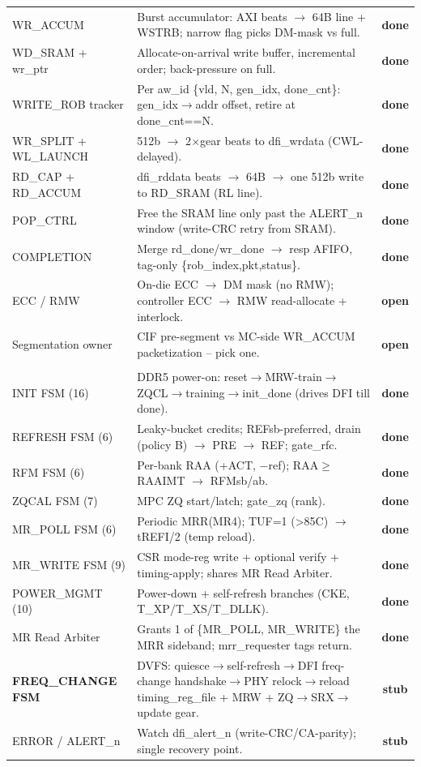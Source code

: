 \documentclass[10pt]{article}
\newcommand{\st}[1]{\textbf{\textcolor{done}{#1}}}
\newcommand{\op}[1]{\textbf{\textcolor{open}{#1}}}
\newcommand{\su}[1]{\textbf{\textcolor{stub}{#1}}}
\begin{document}
{\begin{longtable}{B P S}
\\
\midrule
WR\_ACCUM          & Burst accumulator: AXI beats $\to$ 64B line + WSTRB; narrow flag picks DM-mask vs full. & \st{done}\\
WD\_SRAM + wr\_ptr  & Allocate-on-arrival write buffer, incremental order; back-pressure on full. & \st{done}\\
WRITE\_ROB tracker & Per aw\_id \{vld, N, gen\_idx, done\_cnt\}: gen\_idx$\to$addr offset, retire at done\_cnt==N. & \st{done}\\
WR\_SPLIT + WL\_LAUNCH & 512b $\to$ 2$\times$gear beats to dfi\_wrdata (CWL-delayed). & \st{done}\\
RD\_CAP + RD\_ACCUM & dfi\_rddata beats $\to$ 64B $\to$ one 512b write to RD\_SRAM (RL line). & \st{done}\\
POP\_CTRL          & Free the SRAM line only past the ALERT\_n window (write-CRC retry from SRAM). & \st{done}\\
COMPLETION         & Merge rd\_done/wr\_done $\to$ resp AFIFO, tag-only \{rob\_index,pkt,status\}. & \st{done}\\
ECC / RMW          & On-die ECC $\to$ DM mask (no RMW); controller ECC $\to$ RMW read-allocate + interlock. & \op{open}\\
Segmentation owner & CIF pre-segment vs MC-side WR\_ACCUM packetization -- pick one. & \op{open}\\
\midrule

\\
\midrule
INIT FSM (16)      & DDR5 power-on: reset$\to$MRW-train$\to$ZQCL$\to$training$\to$init\_done (drives DFI till done). & \st{done}\\
REFRESH FSM (6)    & Leaky-bucket credits; REFsb-preferred, drain (policy B) $\to$ PRE $\to$ REF; gate\_rfc. & \st{done}\\
RFM FSM (6)        & Per-bank RAA (+ACT, $-$ref); RAA$\geq$RAAIMT $\to$ RFMsb/ab. & \st{done}\\
ZQCAL FSM (7)      & MPC ZQ start/latch; gate\_zq (rank). & \st{done}\\
MR\_POLL FSM (6)   & Periodic MRR(MR4); TUF=1 (>85C) $\to$ tREFI/2 (temp reload). & \st{done}\\
MR\_WRITE FSM (9)  & CSR mode-reg write + optional verify + timing-apply; shares MR Read Arbiter. & \st{done}\\
POWER\_MGMT (10)   & Power-down + self-refresh branches (CKE, T\_XP/T\_XS/T\_DLLK). & \st{done}\\
MR Read Arbiter    & Grants 1 of \{MR\_POLL, MR\_WRITE\} the MRR sideband; mrr\_requester tags return. & \st{done}\\
\textbf{FREQ\_CHANGE FSM} & DVFS: quiesce$\to$self-refresh$\to$DFI freq-change handshake$\to$PHY relock$\to$reload timing\_reg\_file + MRW + ZQ$\to$SRX$\to$update gear. & \su{stub}\\
ERROR / ALERT\_n   & Watch dfi\_alert\_n (write-CRC/CA-parity); single recovery point. & \su{stub}\\
\midrule


\end{longtable}}
\end{document}
